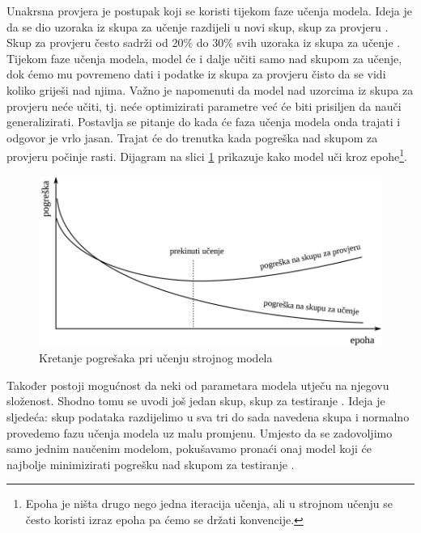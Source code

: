 \documentclass[times, utf8, zavrsni]{fer}
\begin{document}
Unakrsna provjera  je postupak koji se koristi tijekom faze učenja modela. Ideja je da se dio uzoraka iz skupa za učenje razdijeli u novi skup, skup za provjeru . Skup za provjeru često sadrži od 20\% do 30\% svih uzoraka iz skupa za učenje \citep{cupicML}. Tijekom faze učenja modela, model će i dalje učiti samo nad skupom za učenje, dok ćemo mu povremeno dati i podatke iz skupa za provjeru čisto da se vidi koliko griješi nad njima. Važno je napomenuti da model nad uzorcima iz skupa za provjeru neće učiti, tj. neće optimizirati parametre već će biti prisiljen da nauči generalizirati. Postavlja se pitanje do kada će faza učenja modela onda trajati i odgovor je vrlo jasan. Trajat će do trenutka kada pogreška nad skupom za provjeru počinje rasti. Dijagram na slici \ref{fig:cross-validation} prikazuje kako model uči kroz epohe\footnote{Epoha je ništa drugo nego jedna iteracija učenja, ali u strojnom učenju se često koristi izraz epoha pa ćemo se držati konvencije.}.

\begin{figure}[H]
    \centering
    \includegraphics[scale=0.5]{img/cross-validation.png}
    \caption[Caption for LOF]{Kretanje pogrešaka pri učenju strojnog modela\footnotemark}
    \label{fig:cross-validation}
\end{figure}

Također postoji mogućnost da neki od parametara modela utječu na njegovu složenost. Shodno tomu se uvodi još jedan skup, skup za testiranje . Ideja je sljedeća: skup podataka razdijelimo u sva tri do sada navedena skupa i normalno provedemo fazu učenja modela uz malu promjenu. Umjesto da se zadovoljimo samo jednim naučenim modelom, pokušavamo pronaći onaj model koji će najbolje minimizirati pogrešku nad skupom za testiranje \citep{cupicML}.
\end{document}
